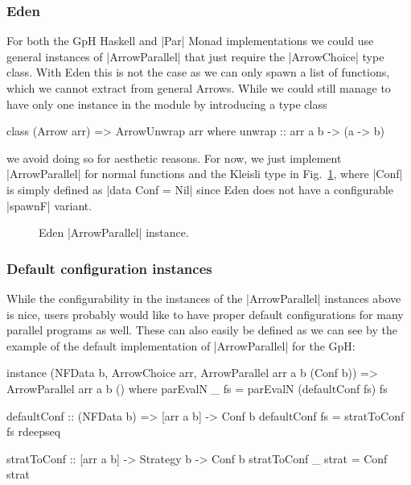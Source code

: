 \subsubsection{Eden}
For both the GpH Haskell and |Par| Monad implementations we could use general instances of |ArrowParallel| that just require the |ArrowChoice| type class. With Eden this is not the case as we can only spawn a list of functions, which we cannot extract from general Arrows. While we could still manage to have only one instance in the module by introducing a type class %
\begin{code}
class (Arrow arr) => ArrowUnwrap arr where
	unwrap :: arr a b -> (a -> b)
\end{code}
we avoid doing so for aesthetic reasons. For now, we just implement |ArrowParallel| for normal functions and the Kleisli type in Fig.~\ref{fig:ArrowParallelEden}, where |Conf| is simply defined as |data Conf = Nil| since Eden does not have a configurable |spawnF| variant. %
\begin{figure}[t]
\caption{Eden |ArrowParallel| instance.}
\label{fig:ArrowParallelEden}
\end{figure}

\subsubsection{Default configuration instances}
While the configurability in the instances of the |ArrowParallel| instances above is nice, users probably would like to have proper default configurations for many parallel programs as well. These can also easily be defined as we can see by the example of the default implementation of |ArrowParallel| for the GpH:

\begin{code}
instance (NFData b, ArrowChoice arr, ArrowParallel arr a b (Conf b)) =>
  ArrowParallel arr a b () where
    parEvalN _ fs = parEvalN (defaultConf fs) fs

defaultConf :: (NFData b) => [arr a b] -> Conf b
defaultConf fs = stratToConf fs rdeepseq

stratToConf :: [arr a b] -> Strategy b -> Conf b
stratToConf _ strat = Conf strat
\end{code}

